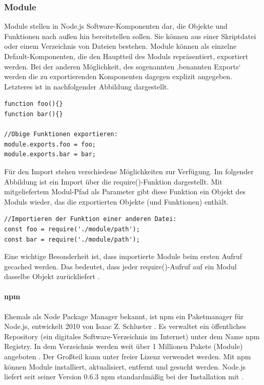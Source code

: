 \newpage
\subsubsection{Module}

\noindent
Module stellen in Node.js Software-Komponenten dar, die Objekte und Funktionen nach außen hin bereitstellen sollen.
Sie können aus einer Skriptdatei oder einem Verzeichnis von Dateien bestehen. Module können als einzelne Default-Komponenten, die den Hauptteil des Moduls repräsentiert, exportiert werden. 
Bei der anderen Möglichkeit, des sogenannten ‚benannten Exports‘ werden die zu exportierenden Komponenten dagegen explizit angegeben. Letzteres ist in nachfolgender Abbildung dargestellt. 
\newline
  
    
\begin{lstlisting}[caption=Benannter Export von Modulen,label=lst:ModuleExport]
function foo(){}
function bar(){}

//Obige Funktionen exportieren:
module.exports.foo = foo;
module.exports.bar = bar;
\end{lstlisting}


\noindent
Für den Import stehen verschiedene Möglichkeiten zur Verfügung.
Im folgender Abbildung ist ein Import über die require()-Funktion dargestellt. 
Mit mitgeliefertem Modul-Pfad als Parameter gibt diese Funktion ein Objekt des Moduls wieder, das die exportierten Objekte (und Funktionen) enthält.
\newline
  
\begin{lstlisting}[caption=Import von Modulen,label=lst:ModuleImport]
//Importieren der Funktion einer anderen Datei:
const foo = require('./module/path');
const bar = require('./module/path');
\end{lstlisting}

\noindent
Eine wichtige Besonderheit ist, dass importierte Module  beim ersten Aufruf gecached werden. 
Das bedeutet, dass jeder require()-Aufruf auf ein Modul dasselbe Objekt zurückliefert \cite{Node1.21}.


\paragraph{npm}
Ehemals als Node Package Manager bekannt, ist npm ein Paketmanager für Node.js, entwickelt 2010 von Isaac Z. Schlueter \cite{Node1.3}. Es verwaltet ein öffentliches Repository (ein digitales Software-Verzeichnis im Internet) unter dem Name npm Registry. In dem Verzeichnis werden weit über 1 Millionen Pakete (Module) angeboten \cite{Node1.4}. Der Großteil kann unter freier Lizenz verwendet werden. Mit npm können Module installiert, aktualisiert, entfernt und gesucht werden. Node.js liefert seit seiner Version 0.6.3 npm standardmäßig bei der Installation mit \cite{Node1.5}.

